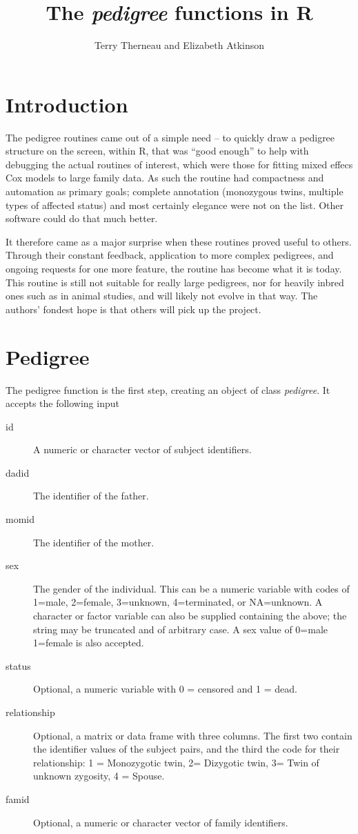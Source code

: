 \documentclass{article}
\title{The \emph{pedigree} functions in R}
\author{Terry Therneau and Elizabeth Atkinson}
\begin{document}
\maketitle
\section{Introduction}
The pedigree routines came out of a simple need -- to quickly draw a
pedigree structure on the screen, within R, that was ``good enough'' to
help with debugging the actual routines of interest, which were those for
fitting mixed effecs Cox models to large family data.  As such the routine
had compactness and automation as primary goals; complete annotation
(monozygous twins, multiple types of affected status) and most certainly
elegance were not on the list.  Other software could do that much
better.

It therefore came as a major surprise when these routines proved useful
to others.  Through their constant feedback, application to more
complex pedigrees, and ongoing requests for one more feature, the routine has 
become what it is today.  This routine is still not 
suitable for really large pedigrees, nor for heavily inbred ones such as in
animal studies, and will likely not evolve in that way.  The authors' fondest%
hope is that others will pick up the project.

\section{Pedigree}
The pedigree function is the first step, creating an object of class
\emph{pedigree}.  
It accepts the following input
\begin{description}
  \item[id] A numeric or character vector of subject identifiers.
  \item[dadid] The identifier of the father.
  \item[momid] The identifier of the mother.
  \item[sex] The gender of the individual.  This can be a numeric variable
    with codes of 1=male, 2=female, 3=unknown, 4=terminated, or NA=unknown.
    A character or factor variable can also be supplied containing
    the above; the string may be truncated and of arbitrary case.  A sex
    value of 0=male 1=female is also accepted.
  \item[status] Optional, a numeric variable with 0 = censored and 1 = dead.
  \item[relationship] Optional, a matrix or data frame with three columns.
    The first two contain the identifier values of the subject pairs, and
    the third the code for their relationship:
    1 = Monozygotic twin, 2= Dizygotic twin, 3= Twin of unknown zygosity,
    4 = Spouse.  
  \item[famid] Optional, a numeric or character vector of family identifiers.
\end{description}
\end{document}

